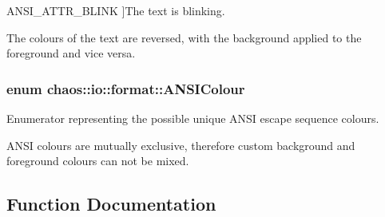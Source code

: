 \begin{Desc}
\begin{description}
{\hypertarget{namespacechaos_1_1io_1_1format_af01119682ec0bc616b49641e0c2a7ccfacd3671458d96396a0fec66c993244186}{}A\+N\+S\+I\+\_\+\+A\+T\+T\+R\+\_\+\+B\+L\+I\+N\+K\label{namespacechaos_1_1io_1_1format_af01119682ec0bc616b49641e0c2a7ccfacd3671458d96396a0fec66c993244186}
}]The text is blinking. \item[{\em 
\hypertarget{namespacechaos_1_1io_1_1format_af01119682ec0bc616b49641e0c2a7ccfaa7b58f4c0365d47d2bc98a4587521806}{}A\+N\+S\+I\+\_\+\+A\+T\+T\+R\+\_\+\+R\+E\+V\+E\+R\+S\+E\label{namespacechaos_1_1io_1_1format_af01119682ec0bc616b49641e0c2a7ccfaa7b58f4c0365d47d2bc98a4587521806}
}]The colours of the text are reversed, with the background applied to the foreground and vice versa. \end{description}
\end{Desc}
\hypertarget{namespacechaos_1_1io_1_1format_aa30dcff2478ffc94e33504c8886a5b1a}{}
\subsubsection[{A\+N\+S\+I\+Colour}]{\setlength{\rightskip}{0pt plus 5cm}enum {\bf chaos\+::io\+::format\+::\+A\+N\+S\+I\+Colour}}\label{namespacechaos_1_1io_1_1format_aa30dcff2478ffc94e33504c8886a5b1a}


Enumerator representing the possible unique A\+N\+S\+I escape sequence colours. 

A\+N\+S\+I colours are mutually exclusive, therefore custom background and foreground colours can not be mixed. 

\subsection{Function Documentation}
\hypertarget{namespacechaos_1_1io_1_1format_a005869cc85ba6d9b0fcfad31cf56bda7}{}
